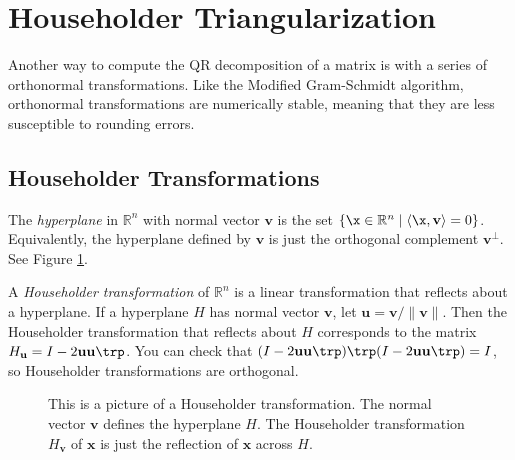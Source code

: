 
\section*{Householder Triangularization} %

Another way to compute the QR decomposition of a matrix is with a series of orthonormal transformations.
Like the Modified Gram-Schmidt algorithm, orthonormal transformations are numerically stable, meaning that they are less susceptible to rounding errors.

\subsection*{Householder Transformations} %

The \emph{hyperplane} in $\mathbb{R}^n$ with normal vector $\mathbf{v}$ is the set $\{ \x \in \mathbb{R}^n \mid \langle \x, \mathbf{v} \rangle = 0 \}$.
Equivalently, the hyperplane defined by $\mathbf{v}$ is just the orthogonal complement $\mathbf{v}^{\perp}$.
See Figure \ref{fig:Householder_reflector}.

A \emph{Householder transformation} of $\mathbb{R}^n$ is a linear transformation that reflects about a hyperplane.
If a hyperplane $H$ has normal vector $\mathbf{v}$, let $\mathbf{u} = \mathbf{v}/\|\mathbf{v}\|$.
Then the Householder transformation that reflects about $H$ corresponds to the matrix $H_{\mathbf{u}} = I - 2 \mathbf{u}\mathbf{u}\trp$.
You can check that $(I - 2 \mathbf{u}\mathbf{u}\trp)\trp(I - 2 \mathbf{u}\mathbf{u}\trp)=I$, so Householder transformations are orthogonal.

\begin{figure}[H]
\begin{center}
\end{center}
\caption{This is a picture of a Householder transformation.
The normal vector $\mathbf{v}$ defines the hyperplane $H$.
The Householder transformation $H_{\mathbf{v}}$ of $\mathbf{x}$ is just the reflection of $\mathbf{x}$ across $H$.}
\label{fig:Householder_reflector}
\end{figure}


